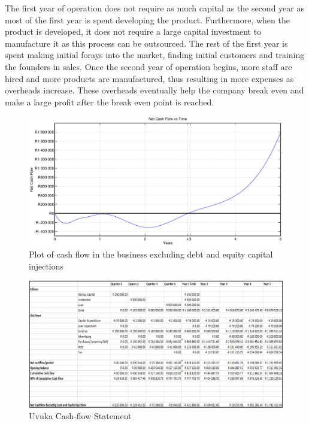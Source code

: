 The first year of operation does not require as much capital as the second year as most of the first year is spent developing the product. Furthermore, when the product is developed, it does not require a large capital investment to manufacture it as this process can be outsourced. The rest of the first year is spent making initial forays into the market, finding initial customers and training the founders in sales. Once the second year of operation begins, more staff are hired and more products are manufactured, thus resulting in more expenses as overheads increase. These overheads eventually help the company break even and make a large profit after the break even point is reached.

\begin{figure}[H]
\centering
\includegraphics[width=1\textwidth]{images/cashflow_plot}
\vskip10pt
\caption[Cash-flow plot]{Plot of cash flow in the business excluding debt and equity capital injections}
\label{fig:cashflowplot}
\end{figure}

\newpage
\thispagestyle{plain}
\begin{landscape}
  \begin{figure}[H]
    \centering
    \includegraphics[width=1.5\textwidth]{images/CashFlowStatement_horizontal}
    \vskip10pt
    \caption[Uvuka Cash-Flow Statement]{Uvuka Cash-flow Statement}
    \label{fig:CashFlowStatement_horizontal}
  \end{figure}
\end{landscape}
\newpage


